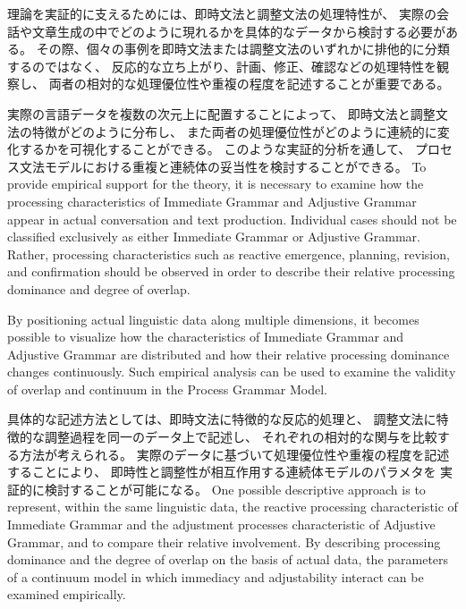 \documentclass[a4paper]{article}
\begin{document}
\ifJPN
理論を実証的に支えるためには、即時文法と調整文法の処理特性が、
実際の会話や文章生成の中でどのように現れるかを具体的なデータから検討する必要がある。
その際、個々の事例を即時文法または調整文法のいずれかに排他的に分類するのではなく、
反応的な立ち上がり、計画、修正、確認などの処理特性を観察し、
両者の相対的な処理優位性や重複の程度を記述することが重要である。

実際の言語データを複数の次元上に配置することによって、
即時文法と調整文法の特徴がどのように分布し、
また両者の処理優位性がどのように連続的に変化するかを可視化することができる。
このような実証的分析を通して、
プロセス文法モデルにおける重複と連続体の妥当性を検討することができる。
\else
To provide empirical support for the theory, it is necessary to examine
how the processing characteristics of Immediate Grammar and Adjustive Grammar
appear in actual conversation and text production.
Individual cases should not be classified exclusively as either Immediate Grammar
or Adjustive Grammar.
Rather, processing characteristics such as reactive emergence, planning,
revision, and confirmation should be observed in order to describe
their relative processing dominance and degree of overlap.

By positioning actual linguistic data along multiple dimensions,
it becomes possible to visualize how the characteristics of Immediate Grammar
and Adjustive Grammar are distributed and how their relative processing dominance
changes continuously.
Such empirical analysis can be used to examine the validity of overlap
and continuum in the Process Grammar Model.
\fi

\ifJPN
具体的な記述方法としては、即時文法に特徴的な反応的処理と、
調整文法に特徴的な調整過程を同一のデータ上で記述し、
それぞれの相対的な関与を比較する方法が考えられる。
実際のデータに基づいて処理優位性や重複の程度を記述することにより、
即時性と調整性が相互作用する連続体モデルのパラメタを
実証的に検討することが可能になる。
\else
One possible descriptive approach is to represent,
within the same linguistic data,
the reactive processing characteristic of Immediate Grammar
and the adjustment processes characteristic of Adjustive Grammar,
and to compare their relative involvement.
By describing processing dominance and the degree of overlap on the basis of actual data,
the parameters of a continuum model in which immediacy and adjustability interact
can be examined empirically.
\fi
\end{document}
